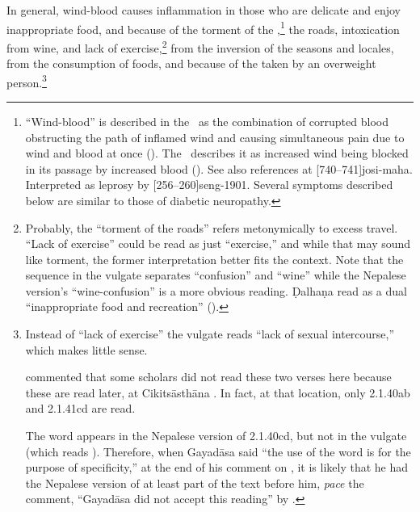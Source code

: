 \begin{translation}
In general, wind-blood causes inflammation in
those who are delicate and enjoy inappropriate food, and because of
the torment of the ,\footnote{“Wind-blood” is described in the
    \SS\  as the combination of corrupted blood obstructing the path of
    inflamed wind and causing simultaneous pain due to wind and blood at
    once ().  The \CS\ describes it as increased wind being
    blocked in its passage by increased blood ().  See
    also references at [740--741]{josi-maha}.  Interpreted as
    leprosy by [256--260]{seng-1901}.  Several symptoms described 
    below are similar to those of diabetic neuropathy.} the
    roads, intoxication from wine, and lack of
    exercise,\footnote{Probably, the “torment of the roads” refers
        metonymically to excess travel. “Lack of exercise” could be read as
        just “exercise,” and while that may sound like torment, the former
        interpretation better fits the context.  Note that the sequence
         in the vulgate separates “confusion” and “wine”
        while the Nepalese version's “wine-confusion” is a more obvious
        reading.  Ḍalhaṇa read  as a dual
        “inappropriate food and recreation” ().} from the inversion of the seasons and locales, from the
        consumption of  foods, and because of the
         taken by an overweight
        person.\footnote{Instead of “lack of exercise” the vulgate reads “lack of 
        sexual intercourse,” which makes little sense.
            
     commented that some scholars did not read
    these two verses here because these are read later, at Cikitsāsthāna
    .  In fact, at that location, only 2.1.40ab and
    2.1.41cd are read.
                
    The word  appears in the Nepalese version of 2.1.40cd,
but not in the vulgate (which reads ). Therefore, when
Gayadāsa said  “the use of the
word  is for the purpose of specificity,” at the end of
his comment on , it is likely that
he had the Nepalese version of at least part of the text before
him, \emph{pace} the comment, “Gayadāsa did not accept this
reading” by \citet[][263, note
2]{vulgate}.}



\end{translation}
